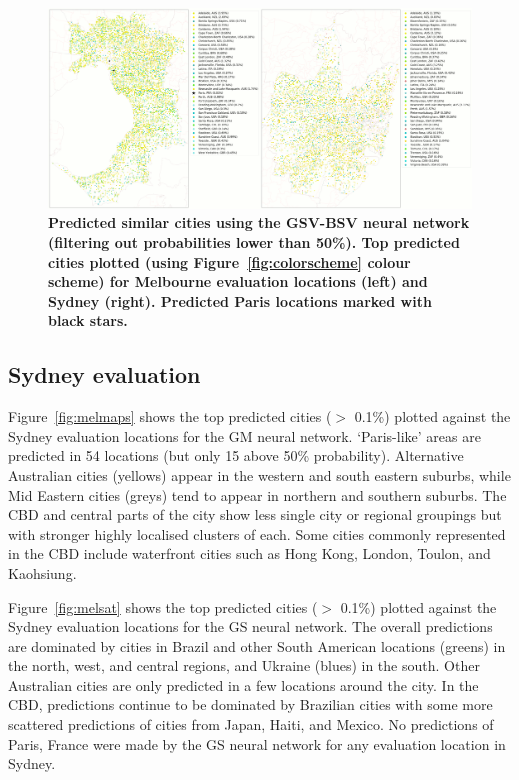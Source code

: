 \documentclass[urbansci,article,submit,moreauthors,pdftex]{Definitions/mdpi}
\begin{document}
\begin{figure}[!htbp]
\centering   
\includegraphics[scale=0.10]{Figure6GSV.png} 
\caption{ \bf Predicted similar cities using the GSV-BSV neural network (filtering out probabilities lower than 50\%). Top predicted cities plotted (using Figure~\ref{fig:colorscheme} colour scheme) for Melbourne evaluation locations (left) and Sydney (right). Predicted Paris locations marked with black stars.}    
 \label{fig:melstreet}  
\end{figure} 

\subsection{Sydney evaluation} 

Figure~\ref{fig:melmaps} shows the top predicted cities ($>$ 0.1\%) plotted against the Sydney evaluation locations for the GM neural network. `Paris-like' areas are predicted in 54 locations (but only 15 above 50\% probability).  Alternative Australian cities (yellows) appear in the western and south eastern suburbs, while Mid Eastern cities (greys) tend to appear in northern and southern suburbs. The CBD and central parts of the city show less single city or regional groupings but with stronger highly localised clusters of each. Some cities commonly represented in the CBD include waterfront cities such as Hong Kong, London, Toulon, and Kaohsiung. 

Figure~\ref{fig:melsat} shows the top predicted cities ($>$ 0.1\%) plotted against the Sydney evaluation locations for the GS neural network. The overall predictions are dominated by cities in Brazil and other South American locations (greens) in the north, west, and central regions, and Ukraine (blues) in the south. Other Australian cities are only predicted in a few locations around the city. In the CBD, predictions continue to be dominated by Brazilian cities with some more scattered predictions of cities from Japan, Haiti, and Mexico. No predictions of Paris, France were made by the GS neural network for any evaluation location in Sydney.
\end{document}
